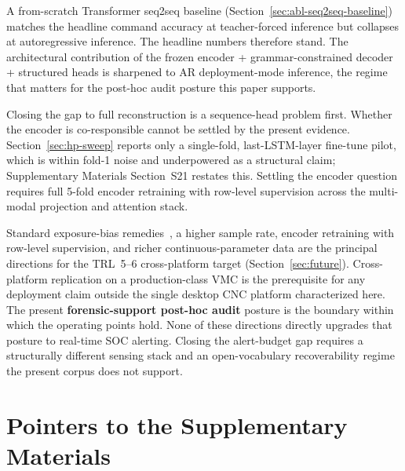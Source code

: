 \documentclass[sensors,article,submit,moreauthors,pdftex]{Definitions/mdpi}
\begin{document}
\begin{enumerate}[label=(\arabic*), leftmargin=*, nosep]
\end{enumerate}

A from-scratch Transformer seq2seq baseline (Section~\ref{sec:abl-seq2seq-baseline}) matches the headline command accuracy at teacher-forced inference but collapses at autoregressive inference. The headline numbers therefore stand. The architectural contribution of the frozen encoder + grammar-constrained decoder + structured heads is sharpened to AR deployment-mode inference, the regime that matters for the post-hoc audit posture this paper supports.

Closing the gap to full reconstruction is a sequence-head problem first. Whether the encoder is co-responsible cannot be settled by the present evidence. Section~\ref{sec:hp-sweep} reports only a single-fold, last-LSTM-layer fine-tune pilot, which is within fold-1 noise and underpowered as a structural claim; Supplementary Materials Section~S21 restates this. Settling the encoder question requires full 5-fold encoder retraining with row-level supervision across the multi-modal projection and attention stack.

Standard exposure-bias remedies~\cite{he2019exposure,ott2018uncertainty,ranzato2016sequence,holtzman2020curious,welleck2020neural}, a higher sample rate, encoder retraining with row-level supervision, and richer continuous-parameter data are the principal directions for the TRL~5--6 cross-platform target (Section~\ref{sec:future}). Cross-platform replication on a production-class VMC is the prerequisite for any deployment claim outside the single desktop CNC platform characterized here. The present \textbf{forensic-support post-hoc audit} posture is the boundary within which the operating points hold. None of these directions directly upgrades that posture to real-time SOC alerting. Closing the alert-budget gap requires a structurally different sensing stack and an open-vocabulary recoverability regime the present corpus does not support.

\appendix
\section{Pointers to the Supplementary Materials}
\label{app:spec-addenda}
\end{document}
